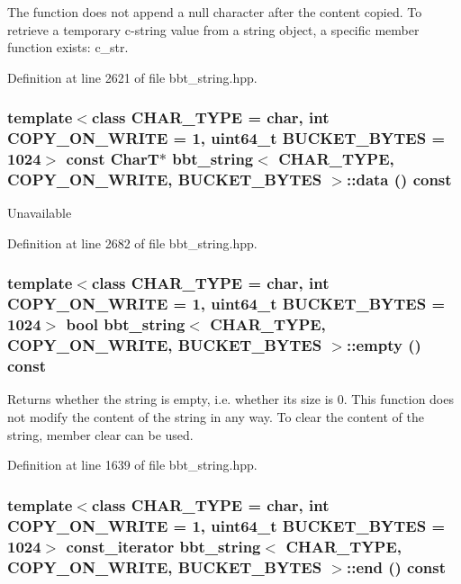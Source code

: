 The function does not append a null character after the content copied. To retrieve a temporary c-string value from a string object, a specific member function exists: c\_\-str. 

Definition at line 2621 of file bbt\_\-string.hpp.\hypertarget{classbbt__string_bd225f98ab68e2385b6d3e23bd4719cb}{
\subsubsection[{data}]{\setlength{\rightskip}{0pt plus 5cm}template$<$class CHAR\_\-TYPE  = char, int COPY\_\-ON\_\-WRITE = 1, uint64\_\-t BUCKET\_\-BYTES = 1024$>$ const CharT$\ast$ {\bf bbt\_\-string}$<$ CHAR\_\-TYPE, COPY\_\-ON\_\-WRITE, BUCKET\_\-BYTES $>$::data () const}}
\label{classbbt__string_bd225f98ab68e2385b6d3e23bd4719cb}


Unavailable 

Definition at line 2682 of file bbt\_\-string.hpp.\hypertarget{classbbt__string_1a6fd2f8eaa83d6f9b33cc01f71af594}{
\subsubsection[{empty}]{\setlength{\rightskip}{0pt plus 5cm}template$<$class CHAR\_\-TYPE  = char, int COPY\_\-ON\_\-WRITE = 1, uint64\_\-t BUCKET\_\-BYTES = 1024$>$ bool {\bf bbt\_\-string}$<$ CHAR\_\-TYPE, COPY\_\-ON\_\-WRITE, BUCKET\_\-BYTES $>$::empty () const}}
\label{classbbt__string_1a6fd2f8eaa83d6f9b33cc01f71af594}


Returns whether the string is empty, i.e. whether its size is 0. This function does not modify the content of the string in any way. To clear the content of the string, member clear can be used. 

Definition at line 1639 of file bbt\_\-string.hpp.\hypertarget{classbbt__string_0ef119a4b2c850ae106876ab9d276977}{
\subsubsection[{end}]{\setlength{\rightskip}{0pt plus 5cm}template$<$class CHAR\_\-TYPE  = char, int COPY\_\-ON\_\-WRITE = 1, uint64\_\-t BUCKET\_\-BYTES = 1024$>$ const\_\-iterator {\bf bbt\_\-string}$<$ CHAR\_\-TYPE, COPY\_\-ON\_\-WRITE, BUCKET\_\-BYTES $>$::end () const}}
\label{classbbt__string_0ef119a4b2c850ae106876ab9d276977}


